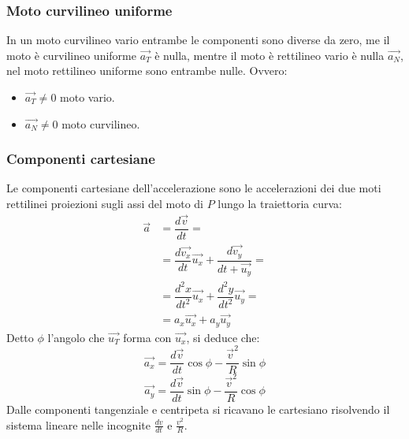 \documentclass[class=book, crop=false, oneside, 12pt]{standalone}
\begin{document}
		\subsubsection{Moto curvilineo uniforme}
    In un moto curvilineo vario entrambe le componenti sono diverse da zero, me il moto \`e curvilineo uniforme $\overrightarrow{a_T}$ \`e nulla, mentre il moto \`e rettilineo vario \`e nulla $\overrightarrow{a_N}$, nel moto rettilineo uniforme sono entrambe nulle.
		Ovvero:
		\begin{multicols}{2}
			\begin{itemize}
        \item $\overrightarrow{a_T}\neq 0$ moto vario.
        \item $\overrightarrow{a_N}\neq 0$ moto curvilineo.
			\end{itemize}
		\end{multicols}
		\subsubsection{Componenti cartesiane}
		Le componenti cartesiane dell'accelerazione sono le accelerazioni dei due moti rettilinei proiezioni sugli assi del moto di $P$ lungo la traiettoria curva:
		\begin{align*}
      \overrightarrow{a}&=\dfrac{d\overrightarrow{v}}{dt}=\\
                        &=\dfrac{d\overrightarrow{v_x}}{dt}\overrightarrow{u_x}+\dfrac{d\overrightarrow{v_y}}{dt+\overrightarrow{u_y}}=\\
                        &=\dfrac{d^2x}{dt^2}\overrightarrow{u_x}+\dfrac{d^2y}{dt^2}\overrightarrow{u_y}=\\
                        &=a_x\overrightarrow{u_x}+a_y\overrightarrow{u_y}
		\end{align*}
    Detto $\phi$ l'angolo che $\overrightarrow{u_T}$ forma con $\overrightarrow{u_x}$, si deduce che:
    $$\overrightarrow{a_x}=\dfrac{d\overrightarrow{v}}{dt}\cos\phi - \dfrac{\overrightarrow{v}^2}{R}\sin\phi$$
    $$\overrightarrow{a_y}=\dfrac{d\overrightarrow{v}}{dt}\sin\phi - \dfrac{\overrightarrow{v}^2}{R}\cos\phi$$
		Dalle componenti tangenziale e centripeta si ricavano le cartesiano risolvendo il sistema lineare nelle incognite $\frac{dv}{dt}$ e $\frac{v^2}{R}$.
\end{document}

